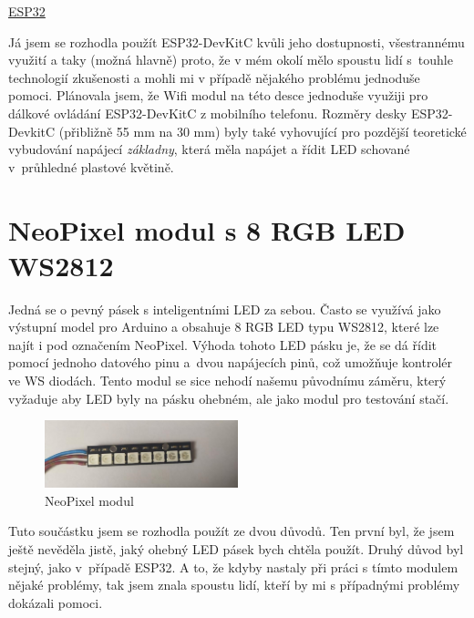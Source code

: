  \href{https://www.espressif.com/sites/default/files/documentation/esp32_datasheet_en.pdf}{ESP32}

Já jsem se rozhodla použít ESP32-DevKitC kvůli jeho dostupnosti, všestrannému využití a taky (možná hlavně) proto, že v mém okolí mělo spoustu lidí s~touhle technologií zkušenosti a mohli mi v případě nějakého problému jednoduše pomoci. 
Plánovala jsem, že Wifi modul na této desce jednoduše využiji pro dálkové ovládání ESP32-DevKitC z mobilního telefonu. Rozměry desky ESP32-DevkitC (přibližně 55 mm na 30 mm) byly také vyhovující pro pozdější teoretické vybudování napájecí \emph{základny}, která měla napájet a řídit LED schované v~průhledné plastové květině.


\section{NeoPixel modul s 8 RGB LED WS2812}
Jedná se o pevný pásek s inteligentními LED za sebou. Často se využívá jako výstupní model pro Arduino a obsahuje 8 RGB LED typu WS2812,\cite {WS2812} které lze najít i pod označením NeoPixel\cite{Neopixel}. Výhoda tohoto LED pásku je, že se dá řídit pomocí jednoho datového pinu a~dvou napájecích pinů, což umožňuje kontrolér ve WS diodách. Tento modul se sice nehodí našemu původnímu záměru, který vyžaduje aby LED byly na pásku ohebném, ale jako modul pro testování stačí.


\begin{figure}[htbp]
	\centering
	\includegraphics[width=0.5\textwidth]{img/NeoPixel2.jpg}
	\caption{NeoPixel modul}
\end{figure}

Tuto součástku jsem se rozhodla použít ze dvou důvodů. Ten první byl, že jsem ještě nevěděla jistě, jaký ohebný LED pásek bych chtěla použít. Druhý důvod byl stejný, jako v~případě ESP32. A to, že kdyby nastaly při práci s tímto modulem nějaké problémy, tak jsem znala spoustu lidí, kteří by mi s případnými problémy dokázali pomoci.

